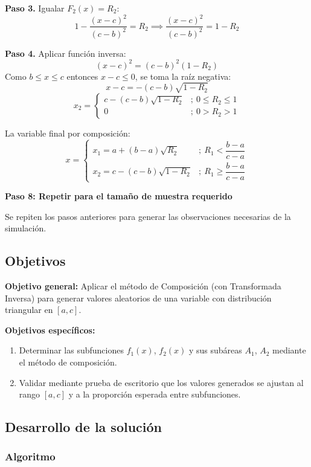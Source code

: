 \documentclass[12pt, a4paper]{article}
\begin{document}
\textbf{Paso 3.} Igualar $F_2(x) = R_2$:
\[
1 - \frac{(x-c)^2}{(c-b)^2} = R_2 \implies \frac{(x-c)^2}{(c-b)^2} = 1-R_2
\]

\textbf{Paso 4.} Aplicar función inversa:
\[
(x-c)^2 = (c-b)^2(1-R_2)
\]
Como $b \leq x \leq c$ entonces $x-c \leq 0$, se toma la raíz negativa:
\[
x-c = -(c-b)\sqrt{1-R_2}
\]
\[
x_2=\begin{cases}c-(c-b)\sqrt{1-R_2} &;\ 0 \leq R_2 \leq 1 \\ 0 &;\ 0 > R_2 > 1\end{cases}
\]

La variable final por composición:
\[
x=\begin{cases}
x_1 = a+(b-a)\sqrt{R_2}   & ;\ R_1 < \dfrac{b-a}{c-a} \\[8pt]
x_2 = c-(c-b)\sqrt{1-R_2} & ;\ R_1 \geq \dfrac{b-a}{c-a}
\end{cases}
\]

\textbf{Paso 8: Repetir para el tamaño de muestra requerido}

Se repiten los pasos anteriores para generar las observaciones necesarias de la simulación.

\subsection{Objetivos}

\textbf{Objetivo general:} Aplicar el método de Composición (con Transformada Inversa) para generar valores aleatorios de una variable con distribución triangular en $[a,c]$.

\textbf{Objetivos específicos:}
\begin{enumerate}
    \item Determinar las subfunciones $f_1(x)$, $f_2(x)$ y sus subáreas $A_1$, $A_2$ mediante el método de composición.
    \item Validar mediante prueba de escritorio que los valores generados se ajustan al rango $[a,c]$ y a la proporción esperada entre subfunciones.
\end{enumerate}

\subsection{Desarrollo de la solución}

\subsubsection{Algoritmo}
\end{document}
